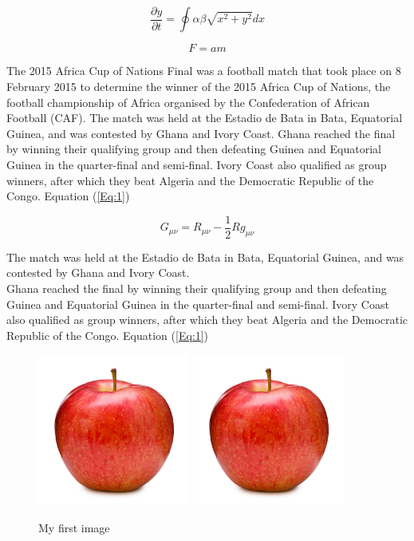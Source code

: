 \documentclass[11pt,a4]{report}
\begin{document}
\begin{equation}
\frac{\partial y}{\partial t}=\oint\alpha\beta\sqrt{x^2+y^2} dx
\label{My_eq}
\end{equation}

\begin{equation}
F=am
\label{Eq:1}
\end{equation}


The 2015 Africa Cup of Nations Final was a football match that took place on 8 February 2015 to determine the winner of the 2015 Africa Cup of Nations, the football championship of Africa organised by the Confederation of African Football (CAF). The match was held at the Estadio de Bata in Bata, Equatorial Guinea, and was contested by Ghana and Ivory Coast. Ghana reached the final by winning their qualifying group and then defeating Guinea and Equatorial Guinea in the quarter-final and semi-final. Ivory Coast also qualified as group winners, after which they beat Algeria and the Democratic Republic of the Congo. Equation (\ref{Eq:1})

\begin{equation}
G_{\mu \nu }=R_{\mu \nu }-{\frac {1}{2}}Rg_{\mu \nu }
\end{equation}

The match was held at the Estadio de Bata in Bata, Equatorial Guinea, and was contested by Ghana and Ivory Coast.\\

Ghana reached the final by winning their qualifying group and then defeating Guinea and Equatorial Guinea in the quarter-final and semi-final. Ivory Coast also qualified as group winners, after which they beat Algeria and the Democratic Republic of the Congo. Equation (\ref{Eq:1})

\begin{figure}[h]
	\centering
	\includegraphics[width=5cm]{images/fig1}
	\includegraphics[width=5cm]{images/fig1}
	\caption{My first image}
	\label{fig:1}
\end{figure}
\end{document}
